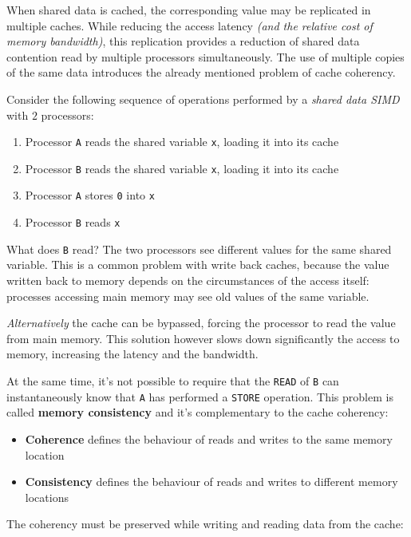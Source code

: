 \documentclass[english]{article}
\begin{document}
When shared data is cached, the corresponding value may be replicated in multiple caches.
While reducing the access latency \textit{(and the relative cost of memory bandwidth)}, this replication provides a reduction of shared data contention read by multiple processors simultaneously.
The use of multiple copies of the same data introduces the already mentioned problem of cache coherency.

\bigskip
Consider the following sequence of operations performed by a \textit{shared data SIMD} with \(2\) processors:

\begin{enumerate}
  \item Processor \texttt{A} reads the shared variable \texttt{x}, loading it into its cache
  \item Processor \texttt{B} reads the shared variable \texttt{x}, loading it into its cache
  \item Processor \texttt{A} stores \texttt{0} into \texttt{x}
  \item Processor \texttt{B} reads \texttt{x}
\end{enumerate}

What does \texttt{B} read?
The two processors see different values for the same shared variable.
This is a common problem with write back caches, because the value written back to memory depends on the circumstances of the access itself: processes accessing main memory may see old values of the same variable.

\textit{Alternatively} the cache can be bypassed, forcing the processor to read the value from main memory.
This solution however slows down significantly the access to memory, increasing the latency and the bandwidth.

At the same time, it's not possible to require that the \texttt{READ} of \texttt{B} can instantaneously know that \texttt{A} has performed a \texttt{STORE} operation.
This problem is called \textbf{memory consistency} and it's complementary to the cache coherency:

\begin{itemize}
  \item \textbf{Coherence} defines the behaviour of reads and writes to the same memory location
  \item \textbf{Consistency} defines the behaviour of reads and writes to different memory locations
\end{itemize}

\bigskip
The coherency must be preserved while writing and reading data from the cache:
\end{document}
